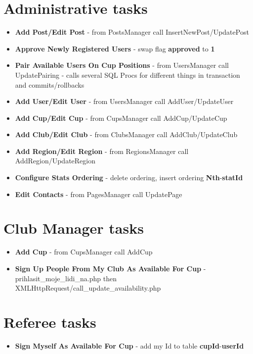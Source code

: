 \section{Administrative tasks}
\begin{itemize}
    \item \textbf{Add Post/Edit Post} - from PostsManager call \newline InsertNewPost/UpdatePost
    \item \textbf{Approve Newly Registered Users} - swap flag \textbf{approved} to \textbf{1}
    \item \textbf{Pair Available Users On Cup Positions} - from UsersManager call UpdatePairing - calls several SQL Procs for different things in transaction and commits/rollbacks
    \item \textbf{Add User/Edit User} - from UsersManager call AddUser/UpdateUser
    \item \textbf{Add Cup/Edit Cup} - from CupsManager call AddCup/UpdateCup
    \item \textbf{Add Club/Edit Club} - from ClubsManager call AddClub/UpdateClub
    \item \textbf{Add Region/Edit Region} - from RegionsManager call AddRegion/UpdateRegion
    \item \textbf{Configure Stats Ordering} - delete ordering, insert ordering \textbf{Nth}-\textbf{statId} 
    \item \textbf{Edit Contacts} - from PagesManager call UpdatePage
\end{itemize} 
\section{Club Manager tasks}
\begin{itemize}
    \item \textbf{Add Cup} - from CupsManager call AddCup
    \item \textbf{Sign Up People From My Club As Available For Cup} - prihlasit\_moje\_lidi\_na.php then XMLHttpRequest/call\_update\_availability.php
\end{itemize}   
\section{Referee tasks}    
\begin{itemize}
    \item \textbf{Sign Myself As Available For Cup} - add my Id to table \textbf{cupId}-\textbf{userId}
\end{itemize}
\fi
\newpage
